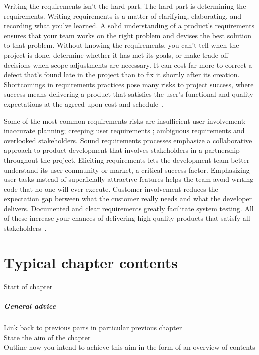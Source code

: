 \documentclass[dissertation,final]{softeng}
\begin{document}
Writing the requirements isn't the hard part. The hard part is determining the requirements. Writing requirements is a matter of clarifying, elaborating, and recording what you've learned. A solid understanding of a product's requirements ensures that your team works on the right problem and devises the best solution to that problem. Without knowing the requirements, you can't tell when the project is done, determine whether it has met its goals, or make trade-off decisions when scope adjustments are necessary. It can cost far more to correct a defect that's found late in the project than to fix it shortly after its creation. Shortcomings in requirements practices pose many risks to project success, where success means delivering a product that satisfies the user's functional and quality expectations at the agreed-upon cost and schedule~\citep{Wiegers2013}.

Some of the most common requirements risks are insufficient user involvement; inaccurate planning; creeping user requirements ; ambiguous requirements and overlooked stakeholders. Sound requirements processes emphasize a collaborative approach to product development that involves stakeholders in a partnership throughout the project. Eliciting requirements lets the development team better understand its user community or market, a critical success factor. Emphasizing user tasks instead of superficially attractive features helps the team avoid writing code that no one will ever execute. Customer involvement reduces the expectation gap between what the customer really needs and what the developer delivers. Documented and clear requirements greatly facilitate system testing. All of these increase your chances of delivering high-quality products that satisfy all stakeholders~\citep{Wiegers2013}.

\chapter{Typical chapter contents}


\underline{Start of chapter}
\paragraph{General advice}
Link back to previous parts in particular previous chapter\\
State the aim of the chapter\\
Outline how you intend to achieve this aim in the form of an overview of contents\\
\end{document}
